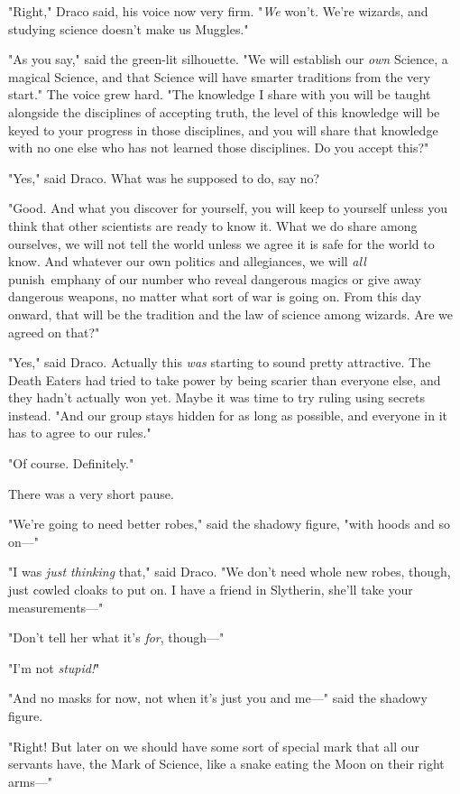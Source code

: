 "Right," Draco said, his voice now very firm. "\emph{We} won't. We're wizards, 
and studying science doesn't make us Muggles."

"As you say," said the green-lit silhouette. "We will establish our \emph{own} 
Science, a magical Science, and that Science will have smarter traditions from 
the very start." The voice grew hard. "The knowledge I share with you will be 
taught alongside the disciplines of accepting truth, the level of this 
knowledge will be keyed to your progress in those disciplines, and you will 
share that knowledge with no one else who has not learned those disciplines. Do 
you accept this?"

"Yes," said Draco. What was he supposed to do, say no?

"Good. And what you discover for yourself, you will keep to yourself unless you 
think that other scientists are ready to know it. What we do share among 
ourselves, we will not tell the world unless we agree it is safe for the world 
to know. And whatever our own politics and allegiances, we will \emph{all} 
punish\ emph{any} of our number who reveal dangerous magics or give away 
dangerous weapons, no matter what sort of war is going on. From this day 
onward, that will be the tradition and the law of science among wizards. Are we 
agreed on that?"

"Yes," said Draco. Actually this \emph{was} starting to sound pretty 
attractive. The Death Eaters had tried to take power by being scarier than 
everyone else, and they hadn't actually won yet. Maybe it was time to try 
ruling using secrets instead. "And our group stays hidden for as long as 
possible, and everyone in it has to agree to our rules."

"Of course. Definitely."

There was a very short pause.

"We're going to need better robes," said the shadowy figure, "with hoods and so 
on---"

"I was \emph{just thinking} that," said Draco. "We don't need whole new robes, 
though, just cowled cloaks to put on. I have a friend in Slytherin, she'll take 
your measurements---"

"Don't tell her what it's \emph{for}, though---"

"I'm not \emph{stupid!}"

"And no masks for now, not when it's just you and me---" said the shadowy 
figure.

"Right! But later on we should have some sort of special mark that all our 
servants have, the Mark of Science, like a snake eating the Moon on their right 
arms---"

